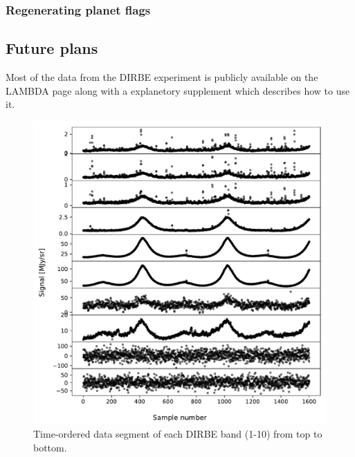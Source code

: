 \documentclass{aa}
\begin{document}
\subsubsection{Regenerating planet flags}

\subsection{Future plans}
Most of the data from the DIRBE experiment is publicly available on the LAMBDA page along with a explanetory supplement which describes how to use it.


\begin{figure}
  \centering
   	\includegraphics[width=\linewidth]{figs/cios.pdf}
  	\caption{Time-ordered data segment of each DIRBE band (1-10) from top to bottom.}
	\label{fig: cios}
\end{figure}
\end{document}
